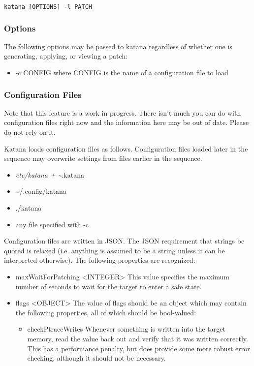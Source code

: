 \documentclass[11pt]{article}
\begin{document}
    \texttt{katana [OPTIONS] -l PATCH}
\subsubsection{Options}
\label{sec-3.5.7}

    The following options may be passed to katana regardless of whether
    one is generating, applying, or viewing a patch:
\begin{itemize}
\item -c CONFIG
      where CONFIG is the name of a configuration file to load
\end{itemize}
\subsubsection{Configuration Files}
\label{sec-3.5.8}

    Note that this feature is a work in progress. There isn't much you
   can do with configuration files right now and the information here
   may be out of date. Please do not rely on it.

    Katana loads configuration files as follows. Configuration files
    loaded later in the sequence may overwrite settings from files
    earlier in the sequence.
\begin{itemize}
\item \emph{etc/katana     + \~{}}.katana
\item \~{}/.config/katana
\item ./katana
\item any file specified with -c
\end{itemize}
    Configuration files are written in JSON. The JSON requirement that
    strings be quoted is relaxed (i.e. anything is assumed to be a
    string unless it can be interpreted otherwise). The following
    properties are recognized:
\begin{itemize}
\item maxWaitForPatching <INTEGER>
      This value specifies the maximum number of seconds to wait for
      the target to enter a safe state.
\item flags <OBJECT>
      The value of flags should be an object which may contain the
      following properties, all of which should be bool-valued:

\begin{itemize}
\item checkPtraceWrites
        Whenever something is written into the target memory, read the
        value back out and verify that it was written correctly. This
        has a performance penalty, but does provide some more robust
        error checking, although it should not be necessary.
\end{itemize}

\end{itemize}
\end{document}

